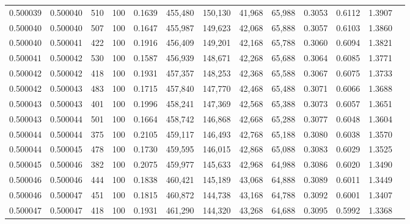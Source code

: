\begin{tabular}{rrrrrrrrrrrrr}
0.500039 & 0.500040 &   510 & 100 &                                     0.1639 & 455,480 & 150,130 &  41,968 &  65,988 & 0.3053 & 0.6112 & 1.3907 \\
0.500040 & 0.500040 &   507 & 100 &                                     0.1647 & 455,987 & 149,623 &  42,068 &  65,888 & 0.3057 & 0.6103 & 1.3860 \\
0.500040 & 0.500041 &   422 & 100 &                                     0.1916 & 456,409 & 149,201 &  42,168 &  65,788 & 0.3060 & 0.6094 & 1.3821 \\
0.500041 & 0.500042 &   530 & 100 &                                     0.1587 & 456,939 & 148,671 &  42,268 &  65,688 & 0.3064 & 0.6085 & 1.3771 \\
0.500042 & 0.500042 &   418 & 100 &                                     0.1931 & 457,357 & 148,253 &  42,368 &  65,588 & 0.3067 & 0.6075 & 1.3733 \\
0.500042 & 0.500043 &   483 & 100 &                                     0.1715 & 457,840 & 147,770 &  42,468 &  65,488 & 0.3071 & 0.6066 & 1.3688 \\
0.500043 & 0.500043 &   401 & 100 &                                     0.1996 & 458,241 & 147,369 &  42,568 &  65,388 & 0.3073 & 0.6057 & 1.3651 \\
0.500043 & 0.500044 &   501 & 100 &                                     0.1664 & 458,742 & 146,868 &  42,668 &  65,288 & 0.3077 & 0.6048 & 1.3604 \\
0.500044 & 0.500044 &   375 & 100 &                                     0.2105 & 459,117 & 146,493 &  42,768 &  65,188 & 0.3080 & 0.6038 & 1.3570 \\
0.500044 & 0.500045 &   478 & 100 &                                     0.1730 & 459,595 & 146,015 &  42,868 &  65,088 & 0.3083 & 0.6029 & 1.3525 \\
0.500045 & 0.500046 &   382 & 100 &                                     0.2075 & 459,977 & 145,633 &  42,968 &  64,988 & 0.3086 & 0.6020 & 1.3490 \\
0.500046 & 0.500046 &   444 & 100 &                                     0.1838 & 460,421 & 145,189 &  43,068 &  64,888 & 0.3089 & 0.6011 & 1.3449 \\
0.500046 & 0.500047 &   451 & 100 &                                     0.1815 & 460,872 & 144,738 &  43,168 &  64,788 & 0.3092 & 0.6001 & 1.3407 \\
0.500047 & 0.500047 &   418 & 100 &                                     0.1931 & 461,290 & 144,320 &  43,268 &  64,688 & 0.3095 & 0.5992 & 1.3368 \\

\end{tabular}
